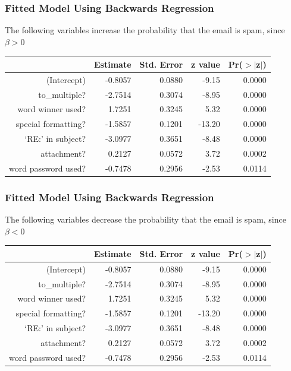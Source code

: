 \documentclass[slides]{beamer}
\newcommand{\blue}[1]{\textcolor{blue2}{#1}}
\begin{document}
\begin{frame}[fragile]
\frametitle{Fitted Model Using Backwards Regression}
The following variables increase the probability that the email is spam, since $\beta>0$

\begin{table}[ht]
\centering
\begin{tabular}{r|rrrr}
  \hline
 & Estimate & Std. Error & z value & Pr($>$$|$z$|$) \\ 
  \hline
(Intercept) & -0.8057 & 0.0880 & -9.15 & 0.0000 \\ 
  to\_multiple? & -2.7514 & 0.3074 & -8.95 & 0.0000 \\ 
  \blue{word winner used?} & \blue{1.7251} & \blue{0.3245} & \blue{5.32} & \blue{0.0000} \\ 
  special formatting? & -1.5857 & 0.1201 & -13.20 & 0.0000 \\ 
  `RE:' in subject? & -3.0977 & 0.3651 & -8.48 & 0.0000 \\ 
  \blue{attachment?} & \blue{0.2127} & \blue{0.0572} & \blue{3.72} & \blue{0.0002} \\ 
  word password used? & -0.7478 & 0.2956 & -2.53 & 0.0114 \\ 
   \hline
\end{tabular}
\end{table} 

\end{frame}


\begin{frame}[fragile]
\frametitle{Fitted Model Using Backwards Regression}
The following variables decrease the probability that the email is spam, since $\beta<0$

\begin{table}[ht]
\centering
\begin{tabular}{r|rrrr}
  \hline
 & Estimate & Std. Error & z value & Pr($>$$|$z$|$) \\ 
  \hline
(Intercept) & -0.8057 & 0.0880 & -9.15 & 0.0000 \\ 
  \blue{to\_multiple?} & \blue{-2.7514} & \blue{0.3074} & \blue{-8.95} & \blue{0.0000} \\ 
  word winner used? & 1.7251 & 0.3245 & 5.32 & 0.0000 \\ 
  \blue{special formatting?} & \blue{-1.5857} & \blue{0.1201} & \blue{-13.20} & \blue{0.0000} \\ 
  \blue{`RE:' in subject?} & \blue{-3.0977} & \blue{0.3651} & \blue{-8.48} & \blue{0.0000} \\ 
  attachment? & 0.2127 & 0.0572 & 3.72 & 0.0002 \\ 
  \blue{word password used?} & \blue{-0.7478} & \blue{0.2956} & \blue{-2.53} & \blue{0.0114} \\ 
   \hline
\end{tabular}
\end{table} 

\end{frame}
\end{document}
